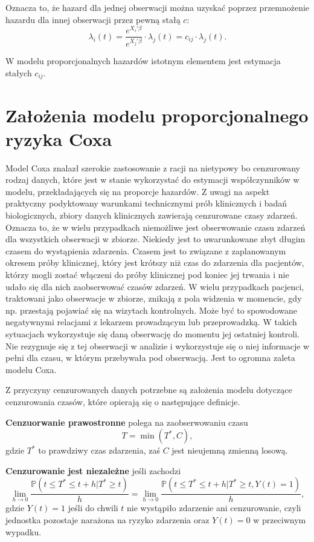 Oznacza to, że hazard dla jednej obserwacji można uzyskać poprzez przemnożenie hazardu dla innej obserwacji przez pewną stałą $c$:
$$\lambda_i(t) = \dfrac{e^{X_i'\beta}}{e^{X_j'\beta}} \cdot \lambda_j(t) = c_{ij} \cdot \lambda_j(t).$$

W modelu proporcjonalnych hazardów istotnym elementem jest estymacja stałych $c_{ij}$.

\section{Założenia modelu proporcjonalnego ryzyka Coxa}

Model Coxa znalazł szerokie zastosowanie z racji na nietypowy bo cenzurowany rodzaj danych, które jest w stanie wykorzystać do estymacji współczynników w modelu, przekładających się na proporcje hazardów. Z uwagi na aspekt praktyczny podyktowany warunkami technicznymi prób klinicznych i badań biologicznych, zbiory danych klinicznych zawierają cenzurowane czasy zdarzeń. Oznacza to, że w wielu przypadkach niemożliwe jest obserwowanie czasu zdarzeń dla wszystkich obserwacji w zbiorze. Niekiedy jest to uwarunkowane zbyt długim czasem do wystąpienia zdarzenia. Czasem jest to związane z zaplanowanym okresem próby klinicznej, który jest krótszy niż czas do zdarzenia dla pacjentów, którzy mogli zostać włączeni do próby klinicznej pod koniec jej trwania i nie udało się dla nich zaobserwować czasów zdarzeń. W wielu przypadkach pacjenci, traktowani jako obserwacje w zbiorze, znikają z pola widzenia w momencie, gdy np. przestają pojawiać się na wizytach kontrolnych. Może być to spowodowane negatywnymi relacjami z lekarzem prowadzącym lub przeprowadzką. W takich sytuacjach wykorzystuje się daną obserwację do momentu jej ostatniej kontroli. Nie rezygnuje się z tej obserwacji w analizie i wykorzystuje się o niej informacje w pełni dla czasu, w którym przebywała pod obserwacją. Jest to ogromna zaleta modelu Coxa.

Z przyczyny cenzurowanych danych potrzebne są założenia modelu dotyczące cenzurowania czasów, które opierają się o następujące definicje.

\begin{definition}
\textbf{Cenzuorwanie prawostronne} polega na zaobserwowaniu czasu 
$$T= \min(T^*, C),$$
gdzie $T^*$ to prawdziwy czas zdarzenia, zaś $C$ jest nieujemną zmienną losową.
\end{definition}


\begin{definition}
\textbf{Cenzurowanie jest niezależne} jeśli zachodzi
$$ \lim\limits_{h\rightarrow 0}\dfrac{\mathbb{P}(t \leq T^* \leq t +h | T^* \geq t)}{h} =  \lim\limits_{h\rightarrow 0}\dfrac{\mathbb{P}(t \leq T^* \leq t +h | T^* \geq t, Y(t) = 1)}{h},$$
gdzie $Y(t) = 1$ jeśli do chwili $t$ nie wystąpiło zdarzenie ani cenzurowanie, czyli jednostka pozostaje narażona na ryzyko zdarzenia oraz $Y(t)=0$ w przeciwnym wypadku.
\end{definition}

